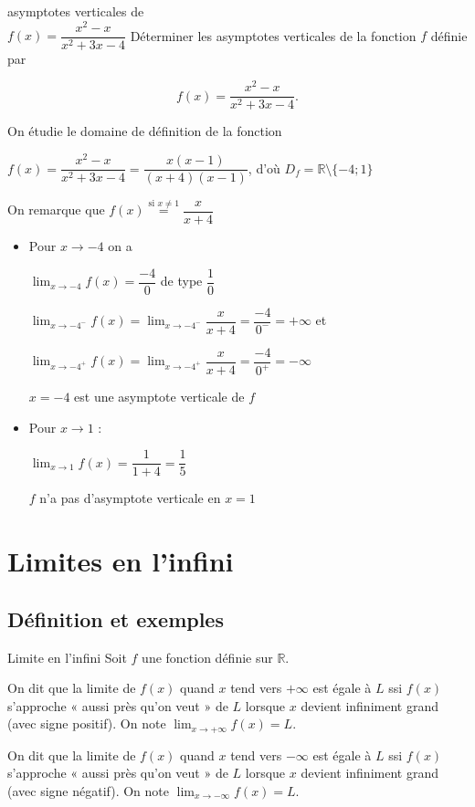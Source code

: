 \documentclass[a4paper,12pt]{article}
\begin{document}
\begin{exemple}[label=ex:asver]
asymptotes verticales de \\
\medskip
$f(x) = \dfrac{x^2 - x}{x^2 + 3x - 4}$
\tcblower
Déterminer les asymptotes verticales de la fonction $f$ définie par 

\[f(x) = \dfrac{x^2 - x}{x^2 + 3x - 4}.\]

On étudie le domaine de définition de la fonction 

$f(x) = \dfrac{x^2 - x}{x^2 + 3x - 4} = \dfrac{x(x - 1)}{(x + 4)(x - 1)}$, d'où $D_f = \mathbb{R} \setminus \{-4; 1\}$

On remarque que $f(x) \stackrel{\text{si }x\neq 1}{=}\dfrac{x}{x + 4}$
\begin{itemize}
	\item Pour $x\rightarrow -4$ on a 

		$\displaystyle\lim_{x \to -4} f(x) = \dfrac{-4}{0}$ de type $\dfrac{1}{0}$

$\displaystyle\lim_{x \to -4^-} f(x) = \lim_{x \to -4^-} \dfrac{x}{x + 4} = \dfrac{-4}{0^-} = +\infty$ et

$\displaystyle\lim_{x \to -4^+} f(x) = \lim_{x \to -4^+} \dfrac{x}{x + 4} = \dfrac{-4}{0^+} = -\infty$

$x = -4$ est une asymptote verticale de $f$
\item Pour $x \to 1$ :

$\displaystyle\lim_{x \to 1} f(x) = \dfrac{1}{1 + 4} = \dfrac{1}{5}$

$f$ n'a pas d'asymptote verticale en $x = 1$
\end{itemize}
\end{exemple}


\section{Limites en l'infini}
\subsection{Définition et exemples}
\begin{definition}
Limite en l'infini	
\tcblower
Soit \(f\) une fonction définie sur \(\mathbb{R}\).

On dit que la limite de \(f(x)\) quand \(x\) tend vers $+\infty$ est égale à \(L\) ssi \(f(x)\) s'approche « aussi près qu'on veut » de \(L\) lorsque \(x\) devient infiniment grand (avec signe positif). On note $\lim_{x\to+\infty}f(x)=L$.

On dit que la limite de \(f(x)\) quand \(x\) tend vers $-\infty$ est égale à \(L\) ssi \(f(x)\) s'approche « aussi près qu'on veut » de \(L\) lorsque \(x\) devient infiniment grand (avec signe négatif). On note $\lim_{x\to-\infty}f(x)=L$.
\end{definition}
\end{document}
